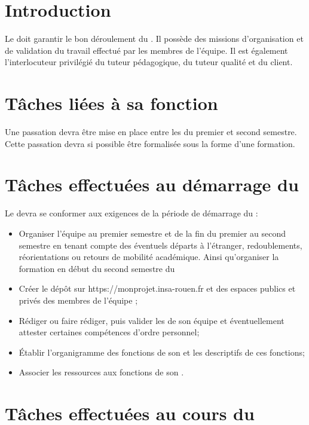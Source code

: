 \documentclass[11pt]{article}
\begin{document}

\section*{Introduction}


Le \CP{} doit garantir le bon déroulement du \PICCourt. Il possède des missions d’organisation et de validation du travail effectué par les membres de l’équipe. Il est également l’interlocuteur privilégié du tuteur pédagogique, du tuteur qualité et du client.

\section*{Tâches liées à sa fonction}

Une passation devra être mise en place entre les \CPs{} du premier et second semestre. Cette passation devra si possible être formalisée sous la forme d’une formation.

\section*{Tâches effectuées au démarrage du \PICCourt}

Le \CP{} devra se conformer aux exigences de la période de démarrage du \PICCourt :
\begin{itemize}
	\item Organiser l’équipe \PICCourt au premier semestre et de la fin du premier au second semestre en tenant compte des éventuels départs à l’étranger, redoublements, réorientations ou retours de mobilité académique. Ainsi qu’organiser la formation en début du second semestre du \PICCourt

	\item Créer le dépôt \git{} sur https://monprojet.insa-rouen.fr et des espaces publics et privés des membres de l’équipe \PICCourt ;
	\item Rédiger ou faire rédiger, puis valider les \FC{} de son équipe et éventuellement attester certaines compétences d’ordre personnel;
	\item Établir l’organigramme des fonctions de son \PICCourt et les descriptifs de ces fonctions;
	\item Associer les ressources aux fonctions de son \PICCourt.
\end{itemize}

\section*{Tâches effectuées au cours du \PICCourt}
\end{document}
